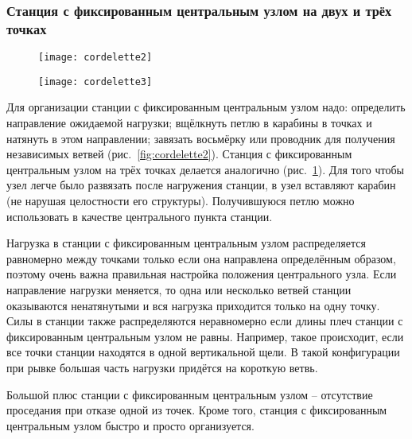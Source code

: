 \documentclass[fleqn, 12pt]{extarticle}
\begin{document}
    \subsubsection{Станция с фиксированным центральным узлом на двух и трёх точках}
    \begin{figure}[h]
        \centering
        \begin{minipage}[t]{0.45\textwidth}
            \centering
            \texttt{[image: cordelette2]}
            \label{fig:cordelette2}
        \end{minipage}\hspace{0.05\textwidth} 
        \begin{minipage}[t]{0.45\textwidth}
            \texttt{[image: cordelette3]}
            \label{fig:cordelette3}
        \end{minipage}
    \end{figure}
    Для организации станции с фиксированным центральным узлом надо: определить направление ожидаемой нагрузки; вщёлкнуть петлю в карабины в точках и натянуть в этом направлении;
    завязать восьмёрку или проводник для получения независимых ветвей (рис.~\ref{fig:cordelette2}).
    Станция с фиксированным центральным узлом на трёх точках делается аналогично (рис.~\ref{fig:cordelette3}).
    Для того чтобы узел легче было развязать после нагружения станции,
    в узел вставляют карабин (не нарушая целостности его структуры). Получившуюся петлю можно использовать в качестве центрального пункта станции.
    
    Нагрузка в станции с фиксированным центральным узлом распределяется равномерно между точками только если она направлена определённым образом,
    поэтому очень важна правильная настройка положения центрального узла. Если направление нагрузки меняется, то одна или несколько ветвей станции оказываются ненатянутыми и вся нагрузка приходится
    только на одну точку. Силы в станции также распределяются неравномерно если длины плеч станции с фиксированным центральным узлом не равны.
    Например, такое происходит, если все точки станции находятся в одной вертикальной щели.
    В такой конфигурации при рывке большая часть нагрузки придётся на короткую ветвь.
    
    Большой плюс станции с фиксированным центральным узлом -- отсутствие проседания при отказе одной из точек. Кроме того, станция с фиксированным центральным узлом
    быстро и просто организуется.
\end{document}
